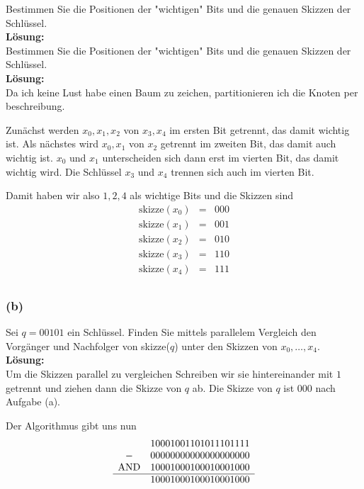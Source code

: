 \documentclass[11pt,a4paper,ngerman]{article}
\begin{document}
Bestimmen Sie die Positionen der "wichtigen" Bits und die genauen Skizzen der Schlüssel.\\

\noindent\textbf{Lösung:}\\

Bestimmen Sie die Positionen der "wichtigen" Bits und die genauen Skizzen der Schlüssel.\\

\noindent\textbf{Lösung:}\\

Da ich keine Lust habe einen Baum zu zeichen, partitionieren ich die Knoten per
beschreibung.

Zunächst werden $x_0,x_1,x_2$ von $x_3,x_4$ im ersten Bit getrennt, das damit
wichtig ist. Als nächstes wird $x_0,x_1$ von $x_2$ getrennt im zweiten Bit,
das damit auch wichtig ist. $x_0$ und $x_1$ unterscheiden sich dann erst im vierten Bit, das damit wichtig wird. Die Schlüssel $x_3$ und $x_4$ trennen sich auch im vierten Bit.

Damit haben wir also $1,2,4$ als wichtige Bits und die Skizzen sind
$$
\begin{array}{rcl}
   \text{skizze}(x_0) &=& 000\\  
   \text{skizze}(x_1) &=& 001\\  
   \text{skizze}(x_2) &=& 010\\  
   \text{skizze}(x_3) &=& 110\\  
   \text{skizze}(x_4) &=& 111\\  
\end{array}
$$


\subsubsection*{(b)}

Sei $q= 00101$ ein Schlüssel. Finden Sie mittels parallelem Vergleich den
Vorgänger und Nachfolger von skizze($q$) unter den Skizzen von $x_0, \ldots, x_4$.\\

\noindent\textbf{Lösung:}\\
Um die Skizzen parallel zu vergleichen Schreiben wir sie hintereinander
mit $1$ getrennt und ziehen dann die Skizze von $q$ ab. Die
Skizze von $q$ ist $000$ nach Aufgabe (a).

Der Algorithmus gibt uns nun
$$
\begin{array}{cl}
     & 1 000 1 001 1 010 1 110 1 111\\
   - & 0 000 0 000 0 000 0 000 0 000\\
   \text{AND} & 1 000 1 000 1 000 1 000 1 000\\
   \hline
   & 1 000 1 000 1 000 1 000 1 000
\end{array}
$$
\end{document}
